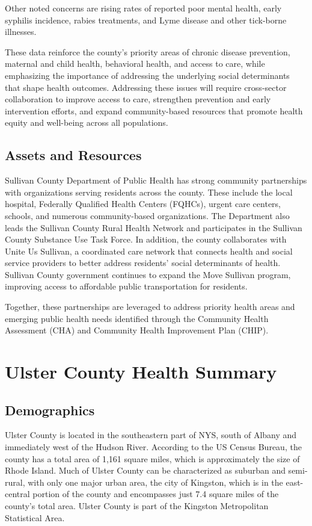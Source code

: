 \documentclass[
  english,
  letterpaper,
]{report}
\begin{document}
Other noted concerns are rising rates of reported poor mental health,
early syphilis incidence, rabies treatments, and Lyme disease and other
tick-borne illnesses.

These data reinforce the county's priority areas of chronic disease
prevention, maternal and child health, behavioral health, and access to
care, while emphasizing the importance of addressing the underlying
social determinants that shape health outcomes. Addressing these issues
will require cross-sector collaboration to improve access to care,
strengthen prevention and early intervention efforts, and expand
community-based resources that promote health equity and well-being
across all populations.

\subsection{Assets and Resources}\label{assets-and-resources-3}

Sullivan County Department of Public Health has strong community
partnerships with organizations serving residents across the county.
These include the local hospital, Federally Qualified Health Centers
(FQHCs), urgent care centers, schools, and numerous community-based
organizations. The Department also leads the Sullivan County Rural
Health Network and participates in the Sullivan County Substance Use
Task Force. In addition, the county collaborates with Unite Us Sullivan,
a coordinated care network that connects health and social service
providers to better address residents' social determinants of health.
Sullivan County government continues to expand the Move Sullivan
program, improving access to affordable public transportation for
residents.

Together, these partnerships are leveraged to address priority health
areas and emerging public health needs identified through the Community
Health Assessment (CHA) and Community Health Improvement Plan (CHIP).

\section{Ulster County Health
Summary}\label{ulster-county-health-summary}

\subsection{Demographics}\label{demographics-5}

Ulster County is located in the southeastern part of NYS, south of
Albany and immediately west of the Hudson River. According to the US
Census Bureau, the county has a total area of 1,161 square miles, which
is approximately the size of Rhode Island. Much of Ulster County can be
characterized as suburban and semi-rural, with only one major urban
area, the city of Kingston, which is in the east-central portion of the
county and encompasses just 7.4 square miles of the county's total area.
Ulster County is part of the Kingston Metropolitan Statistical Area.
\end{document}
